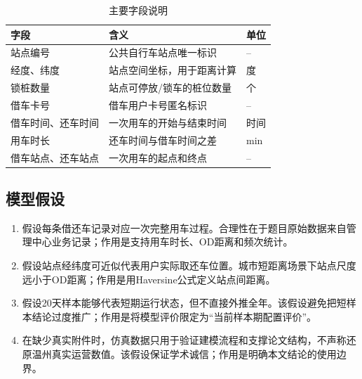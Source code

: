 \documentclass[UTF8,a4paper,12pt]{ctexart}
\begin{document}
\begin{longtable}{p{}p{}p{}}
\caption{主要字段说明}\\
\toprule
字段 & 含义 & 单位\\
\midrule
站点编号 & 公共自行车站点唯一标识 & --\\
经度、纬度 & 站点空间坐标，用于距离计算 & 度\\
锁桩数量 & 站点可停放/锁车的桩位数量 & 个\\
借车卡号 & 借车用户卡号匿名标识 & --\\
借车时间、还车时间 & 一次用车的开始与结束时间 & 时间\\
用车时长 & 还车时间与借车时间之差 & min\\
借车站点、还车站点 & 一次用车的起点和终点 & --\\
\bottomrule
\end{longtable}

\subsection{模型假设}
\begin{enumerate}[itemsep=0.4em]
  \item 假设每条借还车记录对应一次完整用车过程。合理性在于题目原始数据来自管理中心业务记录；作用是支持用车时长、OD距离和频次统计。
  \item 假设站点经纬度可近似代表用户实际取还车位置。城市短距离场景下站点尺度远小于OD距离；作用是用Haversine公式定义站点间距离。
  \item 假设20天样本能够代表短期运行状态，但不直接外推全年。该假设避免把短样本结论过度推广；作用是将模型评价限定为“当前样本期配置评价”。
  \item 在缺少真实附件时，仿真数据只用于验证建模流程和支撑论文结构，不声称还原温州真实运营数值。该假设保证学术诚信；作用是明确本文结论的使用边界。
\end{enumerate}
\end{document}
